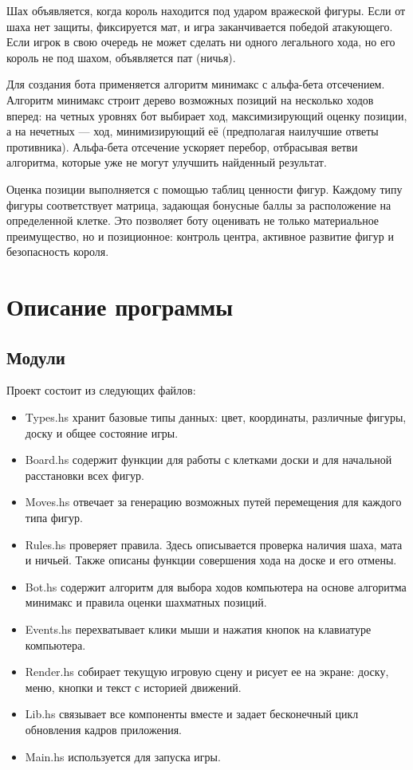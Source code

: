 Шах объявляется, когда король находится под ударом вражеской фигуры. Если от шаха нет защиты, фиксируется мат, и игра заканчивается победой атакующего. Если игрок в свою очередь не может сделать ни одного легального хода, но его король не под шахом, объявляется пат (ничья).

Для создания бота применяется алгоритм минимакс с альфа-бета отсечением. Алгоритм минимакс строит дерево возможных позиций на несколько ходов вперед: на четных уровнях бот выбирает ход, максимизирующий оценку позиции, а на нечетных --- ход, минимизирующий её (предполагая наилучшие ответы противника). Альфа-бета отсечение ускоряет перебор, отбрасывая ветви алгоритма, которые уже не могут улучшить найденный результат.

Оценка позиции выполняется с помощью таблиц ценности фигур. Каждому типу фигуры соответствует матрица, задающая бонусные баллы за расположение на определенной клетке. Это позволяет боту оценивать не только материальное преимущество, но и позиционное: контроль центра, активное развитие фигур и безопасность короля.

\section{Описание программы}
\subsection{Модули}
Проект состоит из следующих файлов:
\begin{itemize}
    \item Types.hs хранит базовые типы данных: цвет, координаты, различные фигуры, доску и общее состояние игры.
    \item Board.hs содержит функции для работы с клетками доски и для начальной расстановки всех фигур.
    \item Moves.hs отвечает за генерацию возможных путей перемещения для каждого типа фигур.
    \item Rules.hs проверяет правила. Здесь описывается проверка наличия шаха, мата и ничьей. Также описаны функции совершения хода на доске и его отмены.
    \item Bot.hs содержит алгоритм для выбора ходов компьютера на основе алгоритма минимакс и правила оценки шахматных позиций.
    \item Events.hs перехватывает клики мыши и нажатия кнопок на клавиатуре компьютера.
    \item Render.hs собирает текущую игровую сцену и рисует ее на экране: доску, меню, кнопки и текст с историей движений.
    \item Lib.hs связывает все компоненты вместе и задает бесконечный цикл обновления кадров приложения.
    \item Main.hs используется для запуска игры.
\end{itemize}


